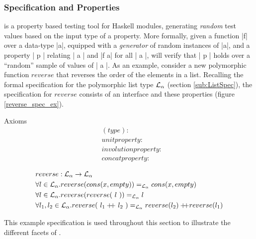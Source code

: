 \subsubsection{Specification and Properties}
\QC is a property based testing tool for Haskell modules,
generating \emph{random} test values 
based on the input type of a property.
More formally, given a function |f| over a data-type |a|, 
equipped with a \emph{generator} of random instances of |a|,
and a property | p | relating | a | and |f a| for all | a |, 
\QC will verify that | p | holds over a ``random'' sample of values of | a |.
As an example, 
consider a new polymorphic function $reverse$ that 
reverses the order of the elements in a list.
Recalling the formal specification for the polymorphic list type $\mathcal{L}_{\alpha}$ (section \ref{sub:ListSpec}),
the specification for $reverse$ consists of an interface and these properties (figure \ref{reverse_spec_ex}).

\begin{figure*}
\begin{minipage}[t]{.3\linewidth}
Axioms
\begin{align*}
& (type) : \\
& unit  property: \\
& involution property: \\
& concat property: 
\end{align*}
\end{minipage}
\begin{minipage}[t]{.1\linewidth}
\end{minipage}
\begin{minipage}[t]{.6\linewidth}
\begin{align*}
& reverse :  \specL_{\alpha} \ra \specL_{\alpha} \\
& \forall l \in \specL_{\alpha}.  reverse (cons(x, empty)) =_{\specL_{\alpha}} cons( x, empty) \\
& \forall l \in \specL_{\alpha}.     reverse (reverse(\ l\ ))  =_{\specL_{\alpha}}l \\
& \forall l_1,l_2 \in \specL_{\alpha} .  reverse(\ l_1 \concat\ l_2\ )  =_{\specL_{\alpha}} reverse( l_2 ) \concat reverse( l_1)
\end{align*}
\end{minipage}
\caption[Axioms for the reverse function.]
{An algebraic specification of a reverse function for the polymorphic list.}
\label{reverse_spec_ex}
\end{figure*}

\noindent This example specification is used throughout this section
to illustrate the different facets of \QC.

